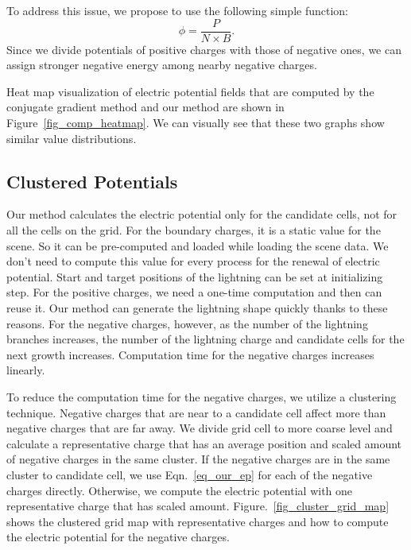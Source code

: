 To address this issue, we propose to use the following simple function: 
\begin{equation} \label{eq_fianl_ep}
\phi = \frac{P}{N \times B}.
\end{equation}
Since we divide potentials of positive charges with those of negative ones,
we can assign stronger negative energy among nearby negative charges.

Heat map visualization of electric potential fields that are computed by the
conjugate gradient method and our method are shown in
Figure~\ref{fig_comp_heatmap}. 
We can visually see that these two graphs show similar value distributions.


\subsection{Clustered Potentials}



Our method calculates the electric potential only for the candidate cells, not
for all the cells on the grid. 
For the boundary charges, it is a static value for
the scene. So it can be pre-computed and loaded while loading the scene data.
We don't need to compute this value for every process for the renewal of
electric potential. Start and target positions of the lightning can be set at
initializing step. For the positive charges, we need a one-time computation and
then can reuse it. Our method can generate the lightning shape quickly thanks
to these reasons. For the negative charges, however, as the number of the
lightning branches increases, the number of the lightning charge and candidate
cells for the next growth increases. Computation time for the negative charges
increases linearly. 

To reduce the computation time for the negative charges, we
utilize a clustering technique. Negative charges that are near to a candidate
cell affect more than negative charges that are far away. We divide grid cell
to more coarse level and calculate a representative charge that has an average
position and scaled amount of negative charges in the same cluster. If the
negative charges are in the same cluster to candidate cell, we use
Eqn.~\ref{eq_our_ep} for each of the negative charges directly. Otherwise, we
compute the electric potential with one representative charge that has scaled
amount.
Figure.~\ref{fig_cluster_grid_map} shows the clustered grid map with representative charges and how to compute the electric potential for the negative charges.

